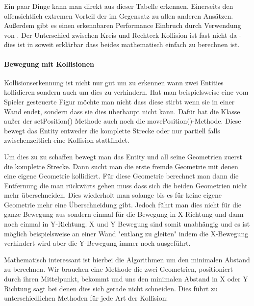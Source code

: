 \vspace*{1 cm}

Ein paar Dinge kann man direkt aus dieser Tabelle erkennen. Einerseits den offensichtlich extremen Vorteil der  im Gegensatz zu allen anderen Ansätzen. Außerdem gibt es einen erkennbaren Performance Einbruch durch Verwendung von . Der Unterschied zwischen Kreis und Rechteck Kollision ist fast nicht da - dies ist in soweit erklärbar dass beides mathematisch einfach zu berechnen ist.


\paragraph{Bewegung mit Kollisionen}

Kollisionserkennung ist nicht nur gut um zu erkennen wann zwei Entities kollidieren sondern auch um dies zu verhindern. Hat man beispielsweise eine vom Spieler gesteuerte Figur möchte man nicht dass diese stirbt wenn sie in einer Wand endet, sondern dass sie dies überhaupt nicht kann.
Dafür hat die Klasse  außer der setPosition() Methode auch noch die movePosition()-Methode. Diese bewegt das Entity entweder die komplette Strecke oder nur partiell falls zwischenzeitlich eine Kollision stattfindet.

Um dies zu zu schaffen bewegt man das Entity und all seine Geometrien zuerst die komplette Strecke. Dann sucht man die erste fremde Geometrie mit denen eine eigene Geometrie kollidiert. Für diese Geometrie berechnet man dann die Entfernung die man rückwärts gehen muss dass sich die beiden Geometrien nicht mehr überschneiden. Dies wiederholt man solange bis es für keine eigene Geometrie mehr eine Überschneidung gibt. Jedoch führt man dies nicht für die ganze Bewegung aus sondern einmal für die Bewegung in X-Richtung und dann noch einmal in Y-Richtung. X und Y Bewegung sind somit unabhängig und es ist möglich beispielsweise an einer Wand "entlang zu gleiten" indem die X-Bewegung verhindert wird aber die Y-Bewegung immer noch ausgeführt.

Mathematisch interessant ist hierbei die Algorithmen um den minimalen Abstand zu berechnen. Wir brauchen eine Methode die zwei Geometrien, positioniert durch ihren Mittelpunkt, bekommt und uns den minimalen Abstand in X oder Y Richtung sagt bei denen dies sich gerade nicht schneiden. Dies führt zu unterschiedlichen Methoden für jede Art der Kollision:


